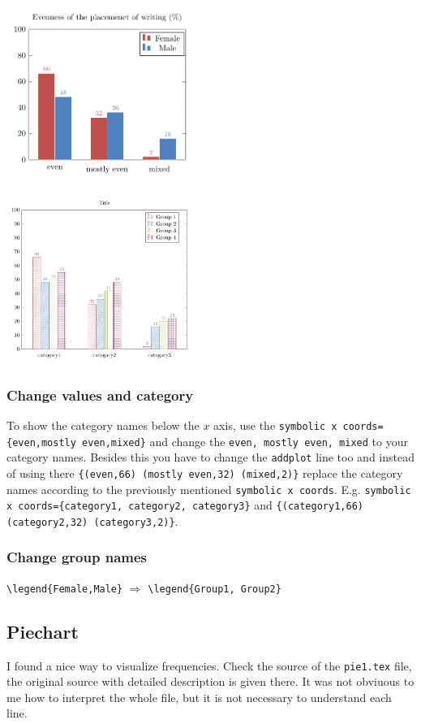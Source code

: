 \documentclass[a4paper]{article}
\begin{document}
	\begin{multicols}{2}	
		\includegraphics[width=0.45\textwidth]{barplot_with_colors}
			
		\includegraphics[width=0.45\textwidth]{barplot_with_patterns}
	\end{multicols}
	
	\subsubsection*{Change values and category}
	To show the category names below the $x$  axis, use the \verb.symbolic x coords={even,mostly even,mixed}. and change the 
	\texttt{even, mostly even, mixed} to your category names. Besides this you have to change the \texttt{addplot} line too and 
instead of using there \verb.{(even,66) (mostly even,32) (mixed,2)}. replace the category names according to the previously mentioned \texttt{symbolic x coords}. E.g. \verb.symbolic x coords={category1, category2, category3}. and \verb.{(category1,66) (category2,32) (category3,2)}..

		
	\subsubsection*{Change group names}
	\verb.\legend{Female,Male}. $\Rightarrow$ \verb.\legend{Group1, Group2}.

	
	
	\subsection{Piechart}
	I found a nice way to visualize frequencies. Check the source of the \texttt{pie1.tex} file, the original source with detailed description is given there.  It was not obviuous to me how to interpret the whole file, but it is not necessary to understand each line.
		
\end{document}
